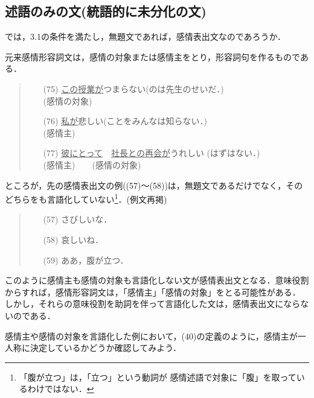 \subsection{述語のみの文(統語的に未分化の文)}

では，3.1の条件を満たし，無題文であれば，感情表出文なのであろうか．

元来感情形容詞文は，感情の対象または感情主をとり，形容詞句を作るものである．

\vspace{0.3cm}
\begin{quote}
\begin{itemize}
 \item[(75)] \underline{この授業が}つまらない(のは先生のせいだ．)\\
	     (感情の対象)
 \item[(76)] \underline{私が}悲しい(ことをみんなは知らない．)\\
	     (感情主)
 \item[(77)] \underline{彼にとって}　\underline{社長との再会が}うれしい
	     (はずはない．)\\
	     (感情主)　　(感情の対象)
\end{itemize}
\end{quote}
\vspace{0.3cm}

ところが，先の感情表出文の例((57)〜(58))は，無題文であるだけでなく，その
どちらをも言語化していない\footnote{「腹が立つ」は，「立つ」という動詞が
感情述語で対象に「腹」を取っているわけではない．}．(例文再掲)

\vspace{0.3cm}
\begin{quote}
\begin{itemize}
 \item[(57)] さびしいな．
 \item[(58)] 哀しいね．
 \item[(59)] ああ，腹が立つ．
\end{itemize}
\end{quote}
\vspace{0.3cm}

このように感情主も感情の対象も言語化しない文が感情表出文となる．意味役割
からすれば，感情形容詞文は，「感情主」「感情の対象」をとる可能性がある．
しかし，それらの意味役割を助詞を伴って言語化した文は，感情表出文にならな
いのである．

感情主や感情の対象を言語化した例において，(40)の定義のように，感情主が一
人称に決定しているかどうか確認してみよう．

